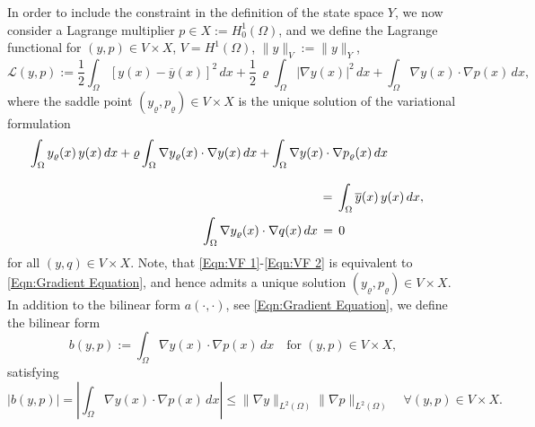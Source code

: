 \documentclass{article}
\numberwithin{equation}{section}
\begin{document}
In order to include the constraint in the definition of the state space
$Y$, we now consider a Lagrange multiplier $p \in X := H^1_0(\Omega)$, 
and we define the Lagrange functional for $(y,p) \in V \times X$,
$V=H^1(\Omega)$, $\| y \|_V := \| y \|_Y$,
\[
  {\mathcal{L}}(y,p) :=
  \frac{1}{2} \int_\Omega [y(x)-\overline{y}(x)]^2 \, dx +
  \frac{1}{2} \, \varrho \int_\Omega |\nabla y(x)|^2 \, dx +
  \int_\Omega \nabla y(x) \cdot \nabla p(x) \, dx,
\]
where the saddle point $(y_\varrho, p_\varrho) \in V \times X$
is the unique solution of the variational formulation
\begin{eqnarray}
    \int_\Omega y_\varrho(x) \, y(x) \, dx + \varrho
    \int_\Omega \nabla y_\varrho(x) \cdot \nabla y(x) \, dx +
    \int_\Omega \nabla y(x) \cdot \nabla p_\varrho(x) \, dx
    \hspace*{1cm} && \label{Eqn:VF 1} \\[3mm]
    \nonumber
    = \, \int_\Omega \overline{y}(x) \, y(x) \, dx, && \\
  \int_\Omega \nabla y_\varrho(x) \cdot \nabla q(x) \, dx \, = \, 0
  \hspace*{22mm} && \label{Eqn:VF 2}
\end{eqnarray}
for all $(y,q) \in V \times X$. Note, that \eqref{Eqn:VF 1}-\eqref{Eqn:VF 2}
is equivalent to \eqref{Eqn:Gradient Equation}, and hence admits a unique
solution $(y_\varrho,p_\varrho) \in V \times X$.
In addition to the bilinear form
$a(\cdot,\cdot)$, see \eqref{Eqn:Gradient Equation}, we define the
bilinear form
\[
  b(y,p) := \int_\Omega \nabla y(x) \cdot \nabla p(x) \, dx \quad
  \mbox{for} \; (y,p) \in V \times X,
\]
satisfying
\[
  |b(y,p)|
  = \left| \int_\Omega \nabla y(x) \cdot \nabla p(x) \, dx \right| 
  \leq \|  \nabla y \|_{L^2(\Omega)} \| \nabla p \|_{L^2(\Omega)}
  \quad \forall (y,p) \in V \times X .
\]
\end{document}
